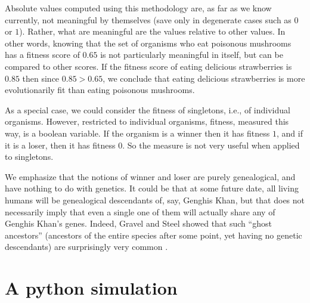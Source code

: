 \documentclass{article}
\begin{document}
Absolute values computed using this methodology are, as far as we know
currently, not meaningful by themselves (save only in degenerate cases
such as $0$ or $1$). Rather, what are meaningful are the values relative
to other values. In other words, knowing that the set of organisms who
eat poisonous mushrooms has a fitness score of $0.65$ is not particularly
meaningful in itself, but can be compared to other scores. If the fitness
score of eating delicious strawberries is $0.85$ then since
$0.85>0.65$, we conclude that eating delicious strawberries is more
evolutionarily fit than eating poisonous mushrooms.

As a special case, we could consider the fitness of singletons, i.e.,
of individual organisms. However, restricted to individual organisms,
fitness, measured this way, is a boolean variable. If the organism is
a winner then it has fitness $1$, and if it is a loser, then it has
fitness $0$. So the measure is not very useful when applied to singletons.

We emphasize that the notions of winner and loser are purely genealogical,
and have nothing to do with genetics. It could be that at some future date,
all living humans will be genealogical descendants of, say, Genghis Khan,
but that does not necessarily imply that even a single one of them will
actually share any of
Genghis Khan's genes. Indeed, Gravel and Steel showed that such ``ghost
ancestors'' (ancestors of the entire species after some point, yet
having no genetic descendants) are surprisingly very
common \cite{gravel2015existence}.

\section{A python simulation}
\label{simulationsecn}
\end{document}
